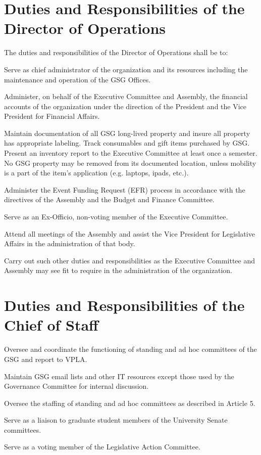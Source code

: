 \section{Duties and Responsibilities of the Director of Operations}
The duties and responsibilities of the Director of Operations shall be to:
\begin{bylaws-number}
  \item Serve as chief administrator of the organization and its resources including the maintenance and operation of the GSG Offices.
  \item Administer, on behalf of the Executive Committee and Assembly, the financial accounts of the organization under the direction of the President and the Vice President for Financial Affairs.
  \item Maintain documentation of all GSG long-lived property and insure all property has appropriate labeling. Track consumables and gift items purchased by GSG. Present an inventory report to the Executive Committee at least once a semester. No GSG property may be removed from its documented location, unless mobility is a part of the item’s application (e.g. laptops, ipads, etc.).
  \item Administer the Event Funding Request (EFR) process in accordance with the directives of the Assembly and the Budget and Finance Committee.
  \item Serve as an Ex-Officio, non-voting member of the Executive Committee.
  \item Attend all meetings of the Assembly and assist the Vice President for Legislative Affairs in the administration of that body.
  \item Carry out such other duties and responsibilities as the Executive Committee and Assembly may see fit to require in the administration of the organization.
\end{bylaws-number}

\section{Duties and Responsibilities of the Chief of Staff}
\begin{bylaws-number}
	\item Oversee and coordinate the functioning of standing and ad hoc committees of the GSG and report to VPLA.
	\item Maintain GSG email lists and other IT resources except those used by the Governance Committee for internal discussion.
	\item Oversee the staffing of standing and ad hoc committees as described in Article 5.
	\item Serve as a liaison to graduate student members of the University Senate committees.
	\item Serve as a voting member of the Legislative Action Committee.
\end{bylaws-number}

